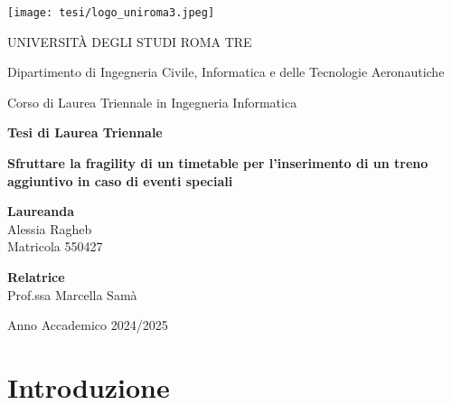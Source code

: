 \documentclass{report}
\begin{document}
\begin{titlepage}
    \centering
    
    \texttt{[image: tesi/logo\_uniroma3.jpeg]}\par\vspace{0.5cm}
    
    {\large UNIVERSITÀ DEGLI STUDI ROMA TRE}\par
    \vspace{0.2cm}
    {\normalsize Dipartimento di Ingegneria Civile, Informatica e delle Tecnologie Aeronautiche}\par
    {\normalsize Corso di Laurea Triennale in Ingegneria Informatica}\par
    \vspace{1.5cm}
    
    {\large \textbf{Tesi di Laurea Triennale}}\par
    \vspace{1.5cm}
    
    {\Large \textbf{Sfruttare la fragility di un timetable
    per l'inserimento di un treno aggiuntivo 
    in caso di eventi speciali}}\par
    \vspace{2cm}
    
    \begin{center}
    \textbf{Laureanda} \\
    Alessia Ragheb \\
    Matricola 550427
    \end{center}
    
    \vspace{1.2cm}
    
    \begin{flushleft}
    \textbf{Relatrice} \\
    Prof.ssa Marcella Samà
    \end{flushleft}
    
    \vfill
    
    {\normalsize Anno Accademico 2024/2025}\par
\end{titlepage}

\onehalfspacing
\tableofcontents

\chapter*{Introduzione}
\end{document}
